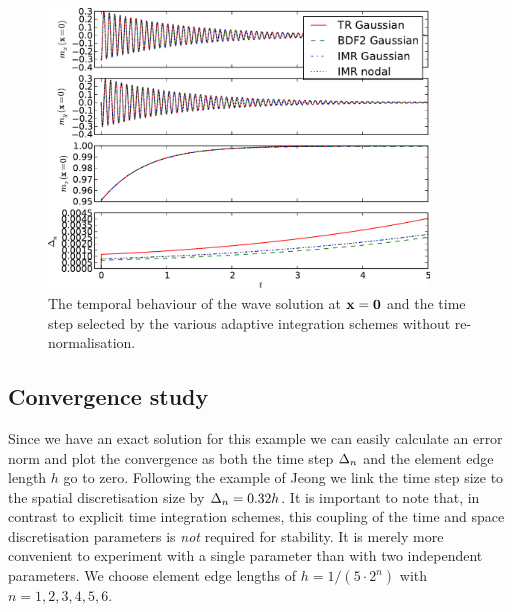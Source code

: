 \begin{figure}
  \centering
  \includegraphics[width=0.9\textwidth]{plots/2d_wave_solution_time_trace/get2oftracevaluesvs-get3oftracevaluesvs-get4oftracevaluesvs-dtsvstimes.pdf}
  \caption{The temporal behaviour of the wave solution at $\boldsymbol{\mathrm{x}} = \mathbf{0}$ and the time step selected by the various adaptive integration schemes without re-normalisation.
    }
  \label{fig:2d-wave-time-trace}
\end{figure}


\subsection{Convergence study}

Since we have an exact solution for this example we can easily calculate an error norm and plot the convergence as both the time step $\Delta_{n}$ and the element edge length $h$ go to zero.
Following the example of Jeong \etal \cite{Jeong2014} we link the time step size to the spatial discretisation size by $\Delta_{n} = 0.32h$.
It is important to note that, in contrast to explicit time integration schemes, this coupling of the time and space discretisation parameters is \emph{not} required for stability.
It is merely more convenient to experiment with a single parameter than with two independent parameters.
We choose element edge lengths of $h = 1/(5 \cdot 2^n)$ with $n=1,2,3,4,5,6$.

